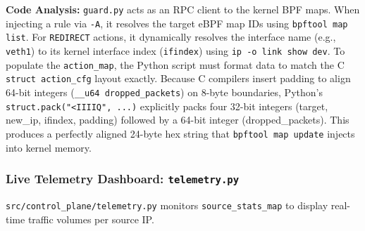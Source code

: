 \documentclass[11pt,a4paper]{article}
\begin{document}
\noindent \textbf{Code Analysis:} \texttt{guard.py} acts as an RPC client to the kernel BPF maps.
When injecting a rule via \texttt{-A}, it resolves the target eBPF map IDs using \texttt{bpftool map list}.
For \texttt{REDIRECT} actions, it dynamically resolves the interface name (e.g., \texttt{veth1}) to its kernel interface index (\texttt{ifindex}) using \texttt{ip -o link show dev}.
To populate the \texttt{action\_map}, the Python script must format data to match the C \texttt{struct action\_cfg} layout exactly.
Because C compilers insert padding to align 64-bit integers (\texttt{\_\_u64 dropped\_packets}) on 8-byte boundaries, Python's \texttt{struct.pack("<IIIIQ", ...)} explicitly packs four 32-bit integers (target, new\_ip, ifindex, padding) followed by a 64-bit integer (dropped\_packets).
This produces a perfectly aligned 24-byte hex string that \texttt{bpftool map update} injects into kernel memory.

\subsubsection{Live Telemetry Dashboard: \texttt{telemetry.py}}

\texttt{src/control\_plane/telemetry.py} monitors \texttt{source\_stats\_map} to display real-time traffic volumes per source IP.
\end{document}
